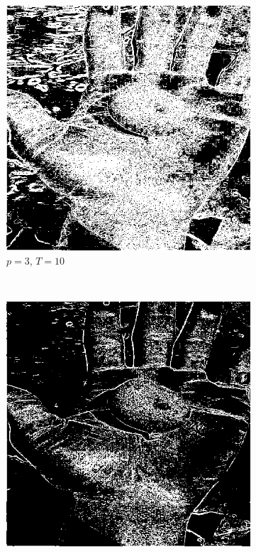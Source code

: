 \documentclass{article}
\begin{document}
\begin{enumerate}[label=(\alph*)]
    \begin{figure}
        \centering
        \begin{subfigure}[b]{0.3\textwidth}
            \includegraphics[width=\textwidth]{img/ED1_3_10.png}
            \caption{$p = 3$, $T = 10$}
        \end{subfigure}
        ~
        \begin{subfigure}[b]{0.3\textwidth}
            \includegraphics[width=\textwidth]{img/ED1_3_30.png}

\end{subfigure}
\end{figure}
\end{enumerate}
\end{document}
